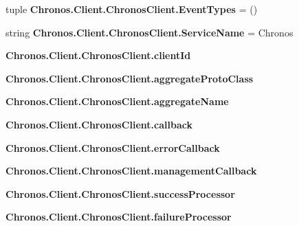 \begin{DoxyCompactItemize}
\item 
tuple {\bfseries Chronos.\+Client.\+Chronos\+Client.\+Event\+Types} = ()\hypertarget{group__Chronos_gae2284be504b2a18f5cdc9d57620d1c0b}{}\label{group__Chronos_gae2284be504b2a18f5cdc9d57620d1c0b}

\item 
string {\bfseries Chronos.\+Client.\+Chronos\+Client.\+Service\+Name} = \textquotesingle{}Chronos\textquotesingle{}\hypertarget{group__Chronos_ga73ec3a648b0423f02d9be78efef8cffd}{}\label{group__Chronos_ga73ec3a648b0423f02d9be78efef8cffd}

\item 
{\bfseries Chronos.\+Client.\+Chronos\+Client.\+client\+Id}\hypertarget{group__Chronos_gaad114760d968da97f8f1927feff56969}{}\label{group__Chronos_gaad114760d968da97f8f1927feff56969}

\item 
{\bfseries Chronos.\+Client.\+Chronos\+Client.\+aggregate\+Proto\+Class}\hypertarget{group__Chronos_ga2c6b00cb135dfeb084a45f5ef0e5688f}{}\label{group__Chronos_ga2c6b00cb135dfeb084a45f5ef0e5688f}

\item 
{\bfseries Chronos.\+Client.\+Chronos\+Client.\+aggregate\+Name}\hypertarget{group__Chronos_gaa88c778f31f423dd65bbb60326514558}{}\label{group__Chronos_gaa88c778f31f423dd65bbb60326514558}

\item 
{\bfseries Chronos.\+Client.\+Chronos\+Client.\+callback}\hypertarget{group__Chronos_gabaa094ace52eab4835af863dc8c134d9}{}\label{group__Chronos_gabaa094ace52eab4835af863dc8c134d9}

\item 
{\bfseries Chronos.\+Client.\+Chronos\+Client.\+error\+Callback}\hypertarget{group__Chronos_ga2a32e40304ea4689ab37c602a638645f}{}\label{group__Chronos_ga2a32e40304ea4689ab37c602a638645f}

\item 
{\bfseries Chronos.\+Client.\+Chronos\+Client.\+management\+Callback}\hypertarget{group__Chronos_ga1943a51621770b8aea4ee348f75ea2d4}{}\label{group__Chronos_ga1943a51621770b8aea4ee348f75ea2d4}

\item 
{\bfseries Chronos.\+Client.\+Chronos\+Client.\+success\+Processor}\hypertarget{group__Chronos_gadfd9070b810f62f0dbf676eca6755b57}{}\label{group__Chronos_gadfd9070b810f62f0dbf676eca6755b57}

\item 
{\bfseries Chronos.\+Client.\+Chronos\+Client.\+failure\+Processor}\hypertarget{group__Chronos_ga658c8d241c24094a017e8a1e86daf795}{}\label{group__Chronos_ga658c8d241c24094a017e8a1e86daf795}


\end{DoxyCompactItemize}
